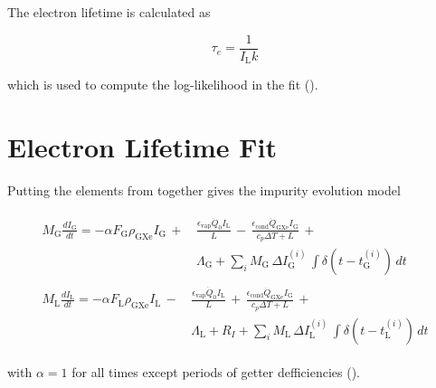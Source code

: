 The electron lifetime is calculated as

\begin{equation}
\tau_e = \frac{1}{I_{\mathrm{L}} k}
\label{eq:electron_lifetime_model_field_lifetime}
\end{equation}

\noindent which is used to compute the log-likelihood in the fit ().



\section{Electron Lifetime Fit}
\label{sec:elifetime_fit}
Putting the elements from  together gives the impurity evolution model

\vspace{-20pt}

\begin{subequations}
\begin{align}
\begin{split}
M_{\mathrm{G}} \frac{dI_{\mathrm{G}}}{dt} = - \alpha F_{\mathrm{G}} \rho_{\mathrm{GXe}} I_{\mathrm{G}}\, + \,
& \frac{\epsilon_{\mathrm{vap}} \dot{Q}_0 I_{\mathrm{L}}}{L}\, - \,
\frac{\epsilon_{\mathrm{cond}} \dot{Q}_{\mathrm{GXe}} I_{\mathrm{G}}}{c_p \Delta T + L}\, + \\
& \Lambda_{\mathrm{G}} + \sum_i  M_{\mathrm{G}}\, \Delta I_{\mathrm{G}}^{(i)}\, \int \delta (t - t_{\mathrm{G}}^{(i)})\, dt
\end{split}
\\
\begin{split}
M_{\mathrm{L}} \frac{dI_{\mathrm{L}}}{dt} = -\alpha F_{\mathrm{L}} \rho_{\mathrm{GXe}} I_{\mathrm{L}}\, - \,
& \frac{\epsilon_{\mathrm{vap}} \dot{Q}_0 I_{\mathrm{L}}}{L}\, + \,
\frac{\epsilon_{\mathrm{cond}} \dot{Q}_{\mathrm{GXe}} I_{\mathrm{G}}}{c_p \Delta T + L}\, + \\
& \Lambda_{\mathrm{L}} + R_I + \sum_i  M_{\mathrm{L}}\, \Delta I_{\mathrm{L}}^{(i)}\, \int \delta (t - t_{\mathrm{L}}^{(i)})\, dt
\end{split}
\end{align}
\label{eq:elifetime_fit_model}
\end{subequations}

\vspace{-15pt}

\noindent with $\alpha = 1$ for all times except periods of getter defficiencies
().



